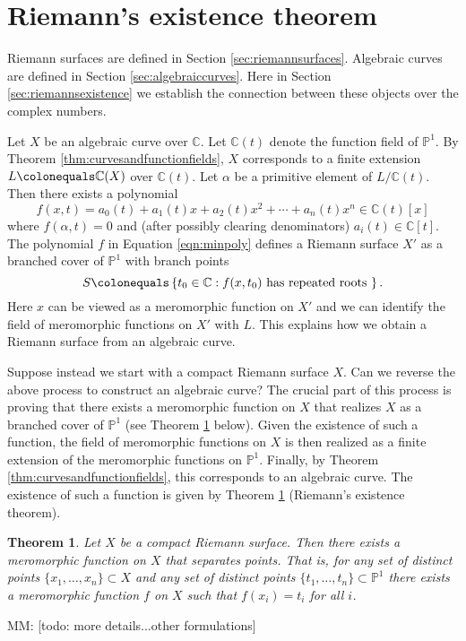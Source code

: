 \documentclass{dcthesis}
\newcommand{\PP}{\mathbb P}
\newcommand{\CC}{\mathbb C}
\newcommand{\mm}[1]{{\color{blue} \sf MM: [#1]}}
\newtheorem{theorem}[prop]{Theorem}
\theoremstyle{definition}
\theoremstyle{remark}
\numberwithin{equation}{section}
\numberwithin{figure}{section}
\begin{document}
{  \section{Riemann's existence theorem}{\label{sec:riemannsexistence}
    Riemann surfaces are defined in Section \ref{sec:riemannsurfaces}.
    Algebraic curves are defined in Section \ref{sec:algebraiccurves}.
    Here in Section \ref{sec:riemannsexistence}
    we establish the connection between these objects over the complex numbers.
    \par
    Let $X$ be an algebraic curve over $\CC$.
    Let $\CC(t)$ denote the function field of $\PP^1$.
    By Theorem \ref{thm:curvesandfunctionfields},
    $X$ corresponds to a finite extension $L\colonequals\CC(X)$
    over $\CC(t)$.
    Let $\alpha$ be a primitive element of $L/\CC(t)$.
    Then there exists a polynomial
    \begin{equation}
      \label{eqn:minpoly}
      f(x,t) = a_0(t)+a_1(t)x+a_2(t)x^2+\cdots+a_n(t)x^n\in\CC(t)[x]
    \end{equation}
    where $f(\alpha,t) = 0$ and (after possibly clearing denominators)
    $a_i(t) \in\CC[t]$.
    The polynomial $f$ in Equation \ref{eqn:minpoly}
    defines a Riemann surface $X'$
    as a branched cover of $\PP^1$
    with branch points
    \[
      S \colonequals\left\{t_0\in\CC : f(x,t_0) \text{ has repeated roots }\right\}.
    \]
    Here $x$ can be viewed as a meromorphic function on $X'$
    and we can identify the field of meromorphic functions on $X'$
    with $L$.
    This explains how we obtain a Riemann surface from an algebraic curve.
    \par
    Suppose instead we start with a compact Riemann surface $X$.
    Can we reverse the above process to construct an algebraic curve?
    The crucial part of this process is proving that
    there exists a meromorphic function on $X$ that realizes $X$
    as a branched cover of $\PP^1$
    (see Theorem \ref{thm:riemannsexistence} below).
    Given the existence of such a function,
    the field of meromorphic functions on $X$ is then realized
    as a finite extension of the meromorphic functions on $\PP^1$.
    Finally,
    by Theorem \ref{thm:curvesandfunctionfields},
    this corresponds to an algebraic curve.
    The existence of such a function
    is given by
    Theorem \ref{thm:riemannsexistence}
    (Riemann's existence theorem).
    \begin{theorem}\label{thm:riemannsexistence}
      Let $X$ be a compact Riemann surface.
      Then there exists a meromorphic function on $X$
      that separates points.
      That is, for any set of distinct points
      $\{x_1,\dots,x_n\}\subset X$
      and any set of distinct points
      $\{t_1,\dots,t_n\}\subset\PP^1$
      there exists a meromorphic function $f$
      on $X$ such that $f(x_i) = t_i$ for all $i$.
    \end{theorem}
    \mm{todo: more details...other formulations}
  }
}
\end{document}
